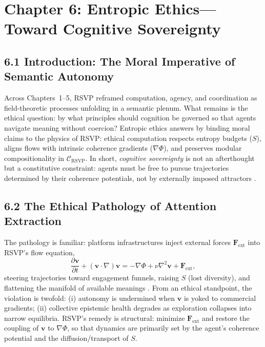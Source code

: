\documentclass[12pt]{article}
\begin{document}
\section*{Chapter 6: Entropic Ethics—Toward Cognitive Sovereignty}

\subsection*{6.1 Introduction: The Moral Imperative of Semantic Autonomy}

Across Chapters~1–5, RSVP reframed computation, agency, and coordination as
field-theoretic processes unfolding in a semantic plenum. What remains is the ethical
question: by what principles should cognition be governed so that agents navigate meaning
without coercion? Entropic ethics answers by binding moral claims to the physics of
RSVP: ethical computation respects entropy budgets (\(S\)), aligns flows with intrinsic
coherence gradients (\(\nabla\Phi\)), and preserves modular compositionality in
\(\mathcal{C}_{\text{RSVP}}\). In short, \emph{cognitive sovereignty} is not an afterthought
but a constitutive constraint: agents must be free to pursue trajectories determined by
their coherence potentials, not by externally imposed attractors \citep{zuboff2019, lanier2018, ortega1957, whitehead1978}.

\subsection*{6.2 The Ethical Pathology of Attention Extraction}

The pathology is familiar: platform infrastructures inject external forces
\(\mathbf{F}_{\mathrm{ext}}\) into RSVP’s flow equation,
\[
\frac{\partial \mathbf{v}}{\partial t} + (\mathbf{v}\!\cdot\!\nabla)\mathbf{v}
= -\nabla\Phi + \nu \nabla^2 \mathbf{v} + \mathbf{F}_{\mathrm{ext}},
\]
steering trajectories toward engagement funnels, raising \(S\) (lost diversity), and
flattening the manifold of available meanings \citep{shannon1948, zuboff2019, lanier2018}.
From an ethical standpoint, the violation is twofold: (i) autonomy is undermined when
\(\mathbf{v}\) is yoked to commercial gradients; (ii) collective epistemic health degrades as
exploration collapses into narrow equilibria. RSVP’s remedy is structural: minimize
\(\mathbf{F}_{\mathrm{ext}}\) and restore the coupling of \(\mathbf{v}\) to \(\nabla\Phi\), so that dynamics are
primarily set by the agent’s coherence potential and the diffusion/transport of \(S\).
\end{document}
